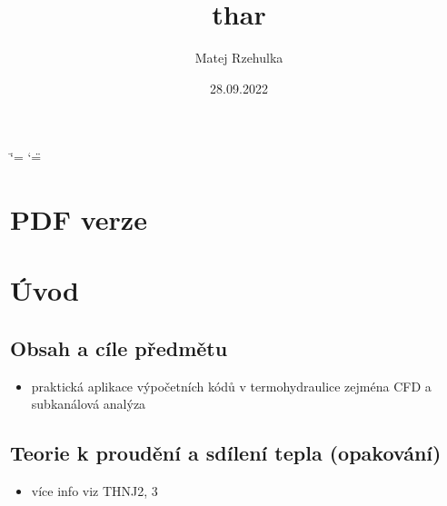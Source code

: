 \documentclass[letterpaper,10pt,czech]{sphinxmanual}
\title{thar}
\date{28.09.2022}
\author{Matej Rzehulka}
\begin{document}
\ifdefined\shorthandoff
  \ifnum\catcode`\=\string=\active\shorthandoff{=}\fi
  \ifnum\catcode`\"=\active{}\fi
\fi

\pagestyle{empty}
\sphinxmaketitle
\pagestyle{plain}
\sphinxtableofcontents
\pagestyle{normal}
\label{\detokenize{index::doc}}


\sphinxstepscope


\chapter{PDF verze}
\label{\detokenize{pdf_link:pdf-verze}}\label{\detokenize{pdf_link::doc}}
\sphinxAtStartPar
{}

\sphinxstepscope


\chapter{Úvod}
\label{\detokenize{prednaska_19092022:uvod}}\label{\detokenize{prednaska_19092022::doc}}

\section{Obsah a cíle předmětu}
\label{\detokenize{prednaska_19092022:obsah-a-cile-predmetu}}\begin{itemize}
\item {} 
\sphinxAtStartPar
praktická aplikace výpočetních kódů v termohydraulice \textendash{} zejména CFD a subkanálová analýza

\end{itemize}


\section{Teorie k proudění a sdílení tepla (opakování)}
\label{\detokenize{prednaska_19092022:teorie-k-proudeni-a-sdileni-tepla-opakovani}}\begin{itemize}
\item {} 
\sphinxAtStartPar
více info viz THNJ2, 3

\end{itemize}
\end{document}
